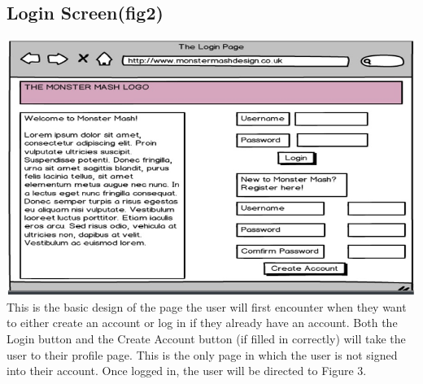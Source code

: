 \documentclass{project}
\begin{document}
\subsection{Login Screen(fig2)}
\includegraphics[scale=0.5]{loginPage.jpg}\\
This is the basic design of the page the user will first encounter when they want to
either create an account or log in if they already have an account. Both the Login
button and the Create Account button (if filled in correctly) will take the user to
their profile page. This is the only page in which the user is not signed into their
account.
Once logged in, the user will be directed to Figure 3.
\end{document}
